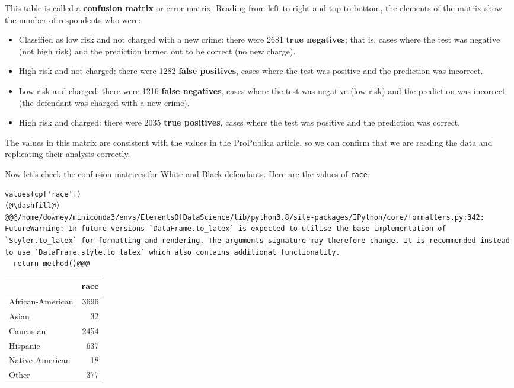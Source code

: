This table is called a \textbf{confusion matrix} or error matrix.
Reading from left to right and top to bottom, the elements of the matrix
show the number of respondents who were:

\begin{itemize}
\item
  Classified as low risk and not charged with a new crime: there were
  2681 \textbf{true negatives}; that is, cases where the test was
  negative (not high risk) and the prediction turned out to be correct
  (no new charge).
\item
  High risk and not charged: there were 1282 \textbf{false positives},
  cases where the test was positive and the prediction was incorrect.
\item
  Low risk and charged: there were 1216 \textbf{false negatives}, cases
  where the test was negative (low risk) and the prediction was
  incorrect (the defendant was charged with a new crime).
\item
  High risk and charged: there were 2035 \textbf{true positives}, cases
  where the test was positive and the prediction was correct.
\end{itemize}

The values in this matrix are consistent with the values in the
ProPublica article, so we can confirm that we are reading the data and
replicating their analysis correctly.

Now let's check the confusion matrices for White and Black defendants.
Here are the values of \passthrough{\lstinline!race!}:

\begin{lstlisting}[]
values(cp['race'])
(@\dashfill@)
@@@/home/downey/miniconda3/envs/ElementsOfDataScience/lib/python3.8/site-packages/IPython/core/formatters.py:342: FutureWarning: In future versions `DataFrame.to_latex` is expected to utilise the base implementation of `Styler.to_latex` for formatting and rendering. The arguments signature may therefore change. It is recommended instead to use `DataFrame.style.to_latex` which also contains additional functionality.
  return method()@@@
\end{lstlisting}

\begin{tabular}{lr}
\midrule
{} &  race \\
\midrule
African-American &  3696 \\
Asian            &    32 \\
Caucasian        &  2454 \\
Hispanic         &   637 \\
Native American  &    18 \\
Other            &   377 \\
\midrule
\end{tabular}

